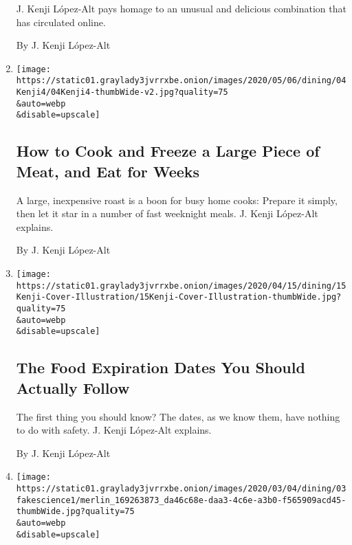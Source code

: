 \begin{enumerate}
  J. Kenji López-Alt pays homage to an unusual and delicious combination
  that has circulated online.

  By J. Kenji López-Alt
\item
  \href{/2020/05/04/dining/bulk-freeze-meat.html}{}

  \texttt{[image: https://static01.graylady3jvrrxbe.onion/images/2020/05/06/dining/04Kenji4/04Kenji4-thumbWide-v2.jpg?quality=75\\\&auto=webp\\\&disable=upscale]}

  \hypertarget{how-to-cook-and-freeze-a-large-piece-of-meat-and-eat-for-weeks}{%
  \subsection{How to Cook and Freeze a Large Piece of Meat, and Eat for
  Weeks}\label{how-to-cook-and-freeze-a-large-piece-of-meat-and-eat-for-weeks}}

  A large, inexpensive roast is a boon for busy home cooks: Prepare it
  simply, then let it star in a number of fast weeknight meals. J. Kenji
  López-Alt explains.

  By J. Kenji López-Alt
\item
  \href{/article/expiration-dates-coronavirus.html}{}

  \texttt{[image: https://static01.graylady3jvrrxbe.onion/images/2020/04/15/dining/15Kenji-Cover-Illustration/15Kenji-Cover-Illustration-thumbWide.jpg?quality=75\\\&auto=webp\\\&disable=upscale]}

  \hypertarget{the-food-expiration-dates-you-should-actually-follow}{%
  \subsection{The Food Expiration Dates You Should Actually
  Follow}\label{the-food-expiration-dates-you-should-actually-follow}}

  The first thing you should know? The dates, as we know them, have
  nothing to do with safety. J. Kenji López-Alt explains.

  By J. Kenji López-Alt
\item
  \href{/2020/03/03/dining/plant-based-meat-science.html}{}

  \texttt{[image: https://static01.graylady3jvrrxbe.onion/images/2020/03/04/dining/03fakescience1/merlin\_169263873\_da46c68e-daa3-4c6e-a3b0-f565909acd45-thumbWide.jpg?quality=75\\\&auto=webp\\\&disable=upscale]}

  \hypertarget{how-do-they-make-plant-based-meat-behave-like-beef}{%
}
\end{enumerate}
